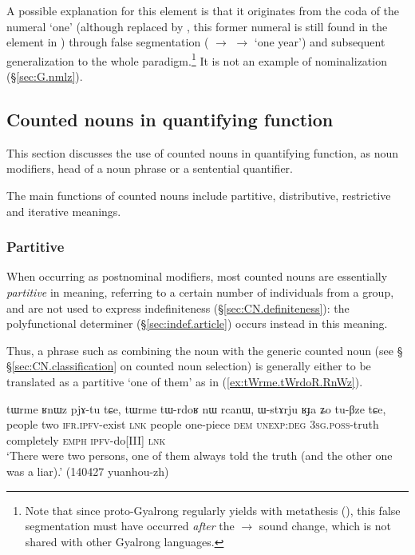 A possible explanation for this  element is that it originates from the coda of the numeral `one' (although replaced by , this former numeral is still found in the element  in ) through false segmentation ( $\rightarrow$  $\rightarrow$  `one year') and subsequent generalization to the whole paradigm.\footnote{Note that since proto-Gyalrong  regularly yields  with metathesis (\citealt[272]{jacques04these}), this false segmentation must have occurred \textit{after} the  $\rightarrow$ sound change, which is not shared with other Gyalrong languages. } It is not an example of  nominalization (§\ref{sec:G.nmlz}).


\subsection{Counted nouns in quantifying function} \label{sec:CN.quantifier}
This section discusses the use of counted nouns in  quantifying function, as noun modifiers, head of a noun phrase or a sentential quantifier.

The main functions of counted nouns include partitive, distributive, restrictive and iterative meanings.

\subsubsection{Partitive} \label{sec:CN.partitive}
 
When occurring as postnominal modifiers, most counted nouns are essentially \textit{partitive} in meaning, referring to a certain number of individuals from a group, and are not used to express indefiniteness (§\ref{sec:CN.definiteness}): the polyfunctional determiner   (§\ref{sec:indef.article}) occurs instead in this meaning.

Thus, a phrase such as   combining the noun  with the generic counted noun  (see § §\ref{sec:CN.classification} on counted noun selection) is generally either to be translated as a partitive `one of them'  as in (\ref{ex:tWrme.tWrdoR.RnWz}).

\begin{exe}
	\ex \label{ex:tWrme.tWrdoR.RnWz}
	\gll tɯrme ʁnɯz pjɤ-tu tɕe, tɯrme tɯ-rdoʁ nɯ rcanɯ, ɯ-stɤrju ʁɟa ʑo tu-βze tɕe, \\
	people two \textsc{ifr}.\textsc{ipfv}-exist \textsc{lnk} people one-piece \textsc{dem} \textsc{unexp}:\textsc{deg} \textsc{3sg}.\textsc{poss}-truth completely \textsc{emph} \textsc{ipfv}-do[III] \textsc{lnk} \\
	\glt `There were two persons, one of them always told the truth (and the other one was a liar).' (140427 yuanhou-zh)
\end{exe} 

